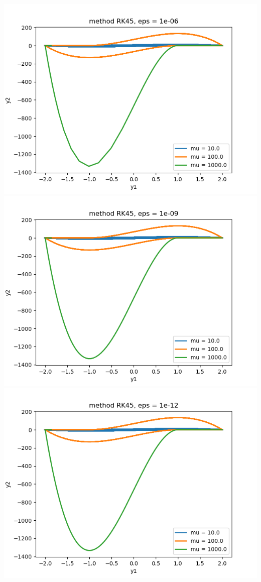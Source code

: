 \documentclass{article}
\begin{document}
\begin{enumerate}
\begin{enumerate}[label=(\alph*)]
	\begin{center}
		\includegraphics[scale=.3]{hw2 p1b method RK45, eps = 1e-06}
		\includegraphics[scale=.3]{hw2 p1b method RK45, eps = 1e-09}
		\includegraphics[scale=.3]{hw2 p1b method RK45, eps = 1e-12}

\end{center}
\end{enumerate}
\end{enumerate}
\end{document}
